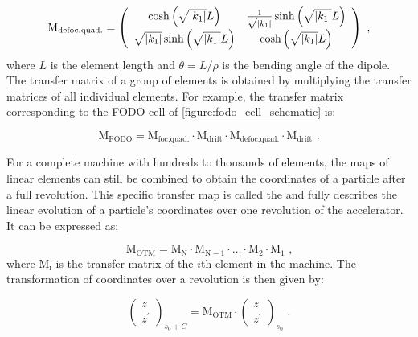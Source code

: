 \begin{equation}
    \mathrm{M_{defoc. quad.}} = \left(
        \begin{array}{cc}
            \cosh \left( \sqrt{\left\lvert k_1 \right\rvert} L \right)                 & \frac{1}{\sqrt{\left\lvert k_1 \right\rvert}} \sinh \left( \sqrt{\left\lvert k_1 \right\rvert} L \right) \\
            \sqrt{\left\lvert k_1 \right\rvert} \sinh \left( \sqrt{\left\lvert k_1 \right\rvert} L \right) & \cosh \left( \sqrt{\left\lvert k_1 \right\rvert} L \right)
    \end{array} \right) \text{ ,}
    \label{equation:defocusing_quad_transfer_matrix}
\end{equation}
where \(L\) is the element length and \(\theta = L / \rho\) is the bending angle of the dipole.
The transfer matrix of a group of elements is obtained by multiplying the transfer matrices of all individual elements.
For example, the transfer matrix corresponding to the FODO cell of \cref{figure:fodo_cell_schematic} is:

\begin{equation}
    \mathrm{M_{FODO}} = \mathrm{M_{foc. quad.}} \cdot \mathrm{M_{drift}} \cdot \mathrm{M_{defoc. quad.}} \cdot \mathrm{M_{drift}} \text{ .}
    \label{equation:fodo_transfer_matrix}
\end{equation}

For a complete machine with hundreds to thousands of elements, the maps of linear elements can still be combined to obtain the coordinates of a particle after a full revolution.
This specific transfer map is called the  and fully describes the linear evolution of a particle's coordinates over one revolution of the accelerator.
It can be expressed as:

\begin{equation}
    \mathrm{M_{OTM}} = \mathrm{M_N} \cdot \mathrm{M_{N-1}} \cdot \ldots \cdot \mathrm{M_2} \cdot \mathrm{M_1} \text{ ,}
    \label{equation:one_turn_map}
\end{equation}
where \(\mathrm{M_i}\) is the transfer matrix of the \(i\)th element in the machine.
The transformation of coordinates over a revolution is then given by:

\begin{equation}
    \left(
        \begin{array}{c}
            z \\
            z^{\prime}
        \end{array} \right)_{s_0 + C} = \mathrm{M_{OTM}} \cdot \left( 
        \begin{array}{c}
            z \\
            z^{\prime}
    \end{array} \right)_{s_0} \text{ .}
    \label{equation:one_turn_coordinates_transformation}
\end{equation}

